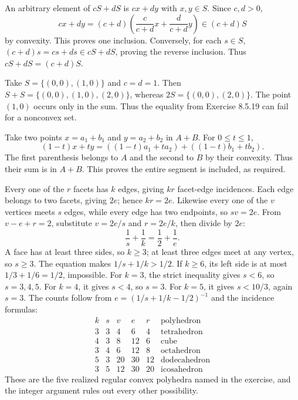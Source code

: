 An arbitrary element of $cS+dS$ is $cx+dy$ with $x,y\in S$.
Since $c,d>0$,
\[
 cx+dy=(c+d)\left(\frac c{c+d}x+\frac d{c+d}y\right)\in(c+d)S
\]
by convexity. This proves one inclusion. Conversely, for each $s\in S$,
$(c+d)s=cs+ds\in cS+dS$, proving the reverse inclusion.
Thus $cS+dS=(c+d)S$.

Take $S=\{(0,0),(1,0)\}$ and $c=d=1$.
Then $S+S=\{(0,0),(1,0),(2,0)\}$, whereas
$2S=\{(0,0),(2,0)\}$. The point $(1,0)$ occurs only in the sum.
Thus the equality from Exercise 8.5.19 can fail for a nonconvex set.

Take two points $x=a_1+b_1$ and $y=a_2+b_2$ in $A+B$.
For $0\le t\le1$,
\[
 (1-t)x+ty=((1-t)a_1+ta_2)+((1-t)b_1+tb_2).
\]
The first parenthesis belongs to $A$ and the second to $B$ by their
convexity. Thus their sum is in $A+B$. This proves the entire segment is
included, as required.

Every one of the $r$ facets has $k$ edges, giving $kr$ facet-edge
incidences. Each edge belongs to two facets, giving $2e$; hence $kr=2e$.
Likewise every one of the $v$ vertices meets $s$ edges, while every edge
has two endpoints, so $sv=2e$.
From $v-e+r=2$, substitute $v=2e/s$ and $r=2e/k$, then divide by $2e$:
\[
 \frac1s+\frac1k=\frac12+\frac1e.
\]
A face has at least three sides, so $k\ge3$; at least three edges meet at
any vertex, so $s\ge3$. The equation makes $1/s+1/k>1/2$.
If $k\ge6$, its left side is at most $1/3+1/6=1/2$, impossible.
For $k=3$, the strict inequality gives $s<6$, so $s=3,4,5$.
For $k=4$, it gives $s<4$, so $s=3$.
For $k=5$, it gives $s<10/3$, again $s=3$.
The counts follow from $e=(1/s+1/k-1/2)^{-1}$ and the incidence formulas:
\[
 \begin{array}{cc|rrr|l}
 k&s&v&e&r&\text{polyhedron}\\\hline
 3&3&4&6&4&\text{tetrahedron}\\
 4&3&8&12&6&\text{cube}\\
 3&4&6&12&8&\text{octahedron}\\
 5&3&20&30&12&\text{dodecahedron}\\
 3&5&12&30&20&\text{icosahedron}
 \end{array}
\]
These are the five realized regular convex polyhedra named in the exercise,
and the integer argument rules out every other possibility.
